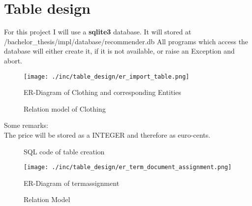 

\section{Table design}
For this project I will use a \textbf{sqlite3} database.
It will stored at /bachelor\_thesis/impl/database/recommender.db
All programs which access the database will either create it, if it is not available, or raise an Exception and abort.\\

\begin{figure}[h]
    \texttt{[image: ./inc/table\_design/er\_import\_table.png]}
    \caption{ER-Diagram of Clothing and corresponding Entities}
\end{figure}

\begin{figure}[h]
    \caption{Relation model of Clothing}
\end{figure}

\bigskip
Some remarks:\\
The price will be stored as a INTEGER and therefore as euro-cents.\\

\begin{figure}[h]
    
    \caption{SQL code of table creation}
\end{figure}

\begin{figure}[h]
    \texttt{[image: ./inc/table\_design/er\_term\_document\_assignment.png]}
    \caption{ER-Diagram of termassignment}
\end{figure}

\begin{figure}[h]
    \caption{Relation Model}
\end{figure}


